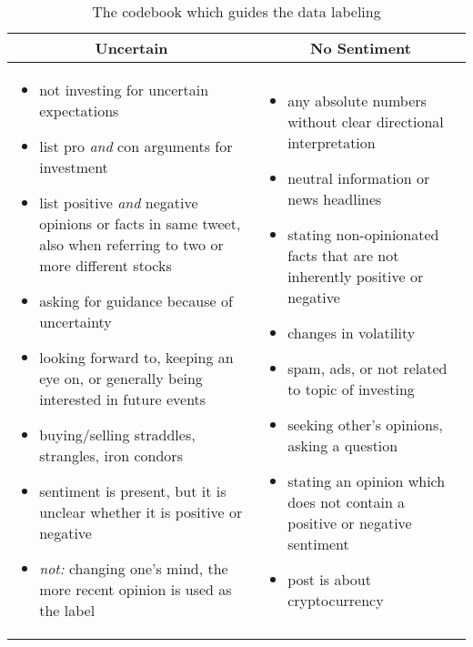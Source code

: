 \begin{table}[!ht]
\centering
\small
\begin{tabular}{p{7.5cm}p{7.5cm}}

\toprule
\multicolumn{1}{c}{\textbf{Uncertain}} & \multicolumn{1}{c}{\textbf{No Sentiment}} \\
\midrule
\begin{itemize}[noitemsep,leftmargin=*,topsep=-12pt]
	\item not investing for uncertain expectations
	\item list pro \emph{and} con arguments for investment
	\item list positive \emph{and} negative opinions or facts in same tweet, also when referring to two or more different stocks
	\item asking for guidance because of uncertainty
	\item looking forward to, keeping an eye on, or generally being interested in future events
	\item buying/selling straddles, strangles, iron condors
	\item sentiment is present, but it is unclear whether it is positive or negative
	\item \emph{not:} changing one's mind, the more recent opinion is used as the label

\end{itemize} & \begin{itemize}[noitemsep,leftmargin=*,topsep=-12pt]
	\item any absolute numbers without clear directional interpretation
	\item neutral information or news headlines
	\item stating non-opinionated facts that are not inherently positive or negative
	\item changes in volatility
	\item spam, ads, or not related to topic of investing
	\item seeking other's opinions, asking a question
	\item stating an opinion which does not contain a positive or negative sentiment
	\item post is about cryptocurrency
\end{itemize}\\

\bottomrule
\end{tabular}
\caption{The codebook which guides the data labeling}
\label{table-codebook}
\end{table}